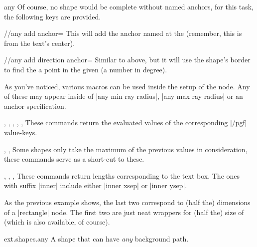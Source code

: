 \begin{ext_shape}{any}
Of course, no shape would be complete without named anchors,
for this task, the following keys are provided.

\begin{key}{/\pgfext/any add anchor=}
  This will add the anchor named  at the  (remember, this is from the text's center).
\end{key}
\begin{key}{/\pgfext/any add direction anchor=}
  Similar to above, but it will use the shape's border to find the a point in the given  (a number in degree).
\end{key}

\clearpage

As you've noticed, various macros can be used inside the setup of the node.
Any of these may appear inside of |any min ray radius|, |any max ray radius|
or an anchor specification.
\begin{commandlist}{%
  \minimumwidth, \minimumheight, \innerxsep, \innerysep, \outerxsep, \outerysep%
}
These commands return the evaluated values of the corresponding |/pgf| value-keys.
\begin{commandlist}{%
  \minimumsize, \innersep, \outersep
}
Some shapes only take the maximum of the previous values in consideration,
these commands serve as a short-cut to these.
\end{commandlist}
\end{commandlist}

\begin{commandlist}{%
  \halftextwidth,
  \halftexttotalheight,
  \halftextwidthinner,
  \halftexttotalheightinner
}
These commands return lengths corresponding to the text box. The ones with suffix |inner| include either |inner xsep| or |inner ysep|.

As the previous example shows, the last two correspond to (half the) dimensions of a |rectangle| node.
The first two are just neat wrappers for (half the) size of 
(which is also available, of course).
\end{commandlist}


\begin{tikzlibrary}{ext.shapes.any}
  A shape that can have \emph{any} background path.
\end{tikzlibrary}


\end{ext_shape}
